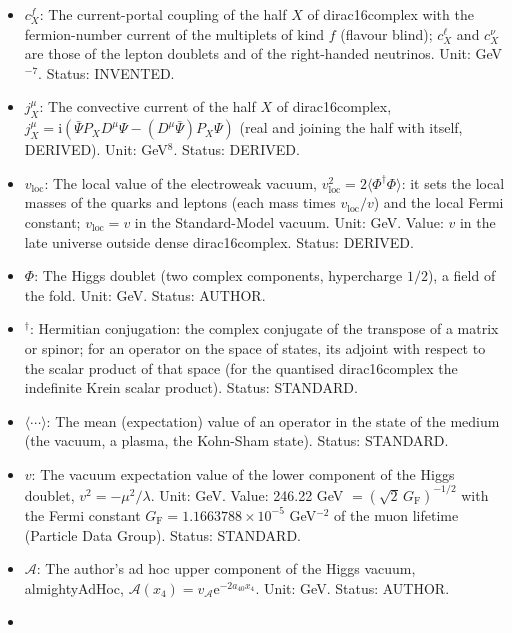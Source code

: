 \documentclass[
  10pt,
]{article}
\begin{document}
\begin{itemize}
  \(X \in \{\mathrm{L}, \mathrm{R}\}\) (left-handed or right-handed
  half); a sum over \(X\) runs over both. Status: STANDARD.
\item
  \(c^{f}_X\): The current-portal coupling of the half \(X\) of
  dirac16complex with the fermion-number current of the multiplets of
  kind \(f\) (flavour blind); \(c^{\ell}_X\) and \(c^{\nu}_X\) are those
  of the lepton doublets and of the right-handed neutrinos. Unit:
  GeV\(^{-7}\). Status: INVENTED.
\item
  \(j_X^\mu\): The convective current of the half \(X\) of
  dirac16complex,
  \(j_X^\mu = \mathrm{i}(\bar\Psi P_XD^\mu\Psi - (D^\mu\bar\Psi)P_X\Psi)\)
  (real and joining the half with itself, DERIVED). Unit: GeV\(^8\).
  Status: DERIVED.
\item
  \(v_{\mathrm{loc}}\): The local value of the electroweak vacuum,
  \(v_{\mathrm{loc}}^2 = 2\langle\Phi^\dagger\Phi\rangle\): it sets the
  local masses of the quarks and leptons (each mass times
  \(v_{\mathrm{loc}}/v\)) and the local Fermi constant;
  \(v_{\mathrm{loc}} = v\) in the Standard-Model vacuum. Unit: GeV.
  Value: \(v\) in the late universe outside dense dirac16complex.
  Status: DERIVED.
\item
  \(\Phi\): The Higgs doublet (two complex components, hypercharge
  \(1/2\)), a field of the fold. Unit: GeV. Status: AUTHOR.
\item
  \({}^\dagger\): Hermitian conjugation: the complex conjugate of the
  transpose of a matrix or spinor; for an operator on the space of
  states, its adjoint with respect to the scalar product of that space
  (for the quantised dirac16complex the indefinite Krein scalar
  product). Status: STANDARD.
\item
  \(\langle\cdots\rangle\): The mean (expectation) value of an operator
  in the state of the medium (the vacuum, a plasma, the Kohn-Sham
  state). Status: STANDARD.
\item
  \(v\): The vacuum expectation value of the lower component of the
  Higgs doublet, \(v^2 = -\mu^2/\lambda\). Unit: GeV. Value: 246.22 GeV
  \(= (\sqrt2\,G_{\mathrm{F}})^{-1/2}\) with the Fermi constant
  \(G_{\mathrm{F}} = 1.1663788\times10^{-5}\) GeV\(^{-2}\) of the muon
  lifetime (Particle Data Group). Status: STANDARD.
\item
  \(\mathcal{A}\): The author's ad hoc upper component of the Higgs
  vacuum, almightyAdHoc,
  \(\mathcal{A}(x_4) = v_{\mathcal{A}}\mathrm{e}^{-2a_{40}x_4}\). Unit:
  GeV. Status: AUTHOR.
\item

\end{itemize}
\end{document}
